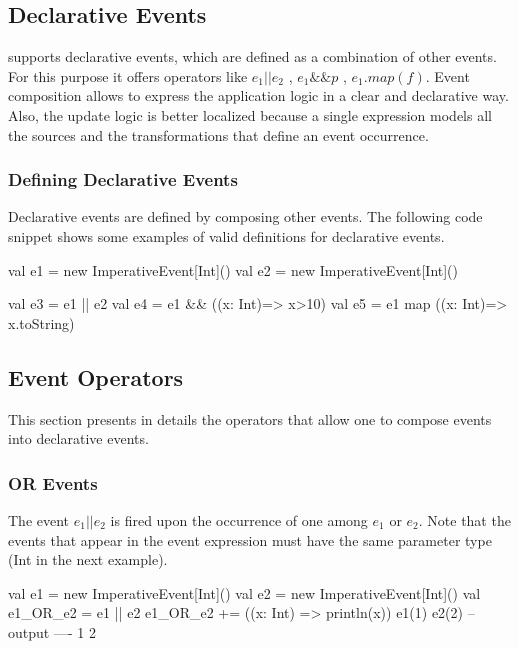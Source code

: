 \documentclass[10pt,a4paper]{article}
\newcommand{\code}[1]{{\fontfamily{cmtt}\small\selectfont#1}}
\newcommand{\REScala}{{\small \sc{REScala}}\xspace}
\begin{document}
\subsection{Declarative Events}

\REScala supports declarative events, which are defined as a
combination of other events. For this purpose it offers operators like
$e_1||e_2$ , $e_1\&\&p$ , $e_1.map(f)$. Event composition allows to
express the application logic in a clear and declarative way. Also,
the update logic is better localized because a single expression
models all the sources and the transformations that define an event
occurrence.


\subsubsection{Defining Declarative Events}

Declarative events are defined by composing other events. The
following code snippet shows some examples of valid definitions for
declarative events.

\begin{codenv}
val e1 = new ImperativeEvent[Int]()
val e2 = new ImperativeEvent[Int]()

val e3 = e1 || e2
val e4 = e1 && ((x: Int)=> x>10)
val e5 = e1 map ((x: Int)=> x.toString)
\end{codenv}


\subsection{Event Operators}

This section presents in details the operators that allow one to
compose events into declarative events.

\subsubsection{OR Events}

The event $e_1 || e_2$ is fired upon the occurrence of one among $e_1$
or $e_2$. Note that the events that appear in the event expression
must have the same parameter type (\code{Int} in the next example).

\begin{codenv}
val e1 = new ImperativeEvent[Int]()
val e2 = new ImperativeEvent[Int]()
val e1_OR_e2 = e1 || e2
e1_OR_e2 += ((x: Int) => println(x))
e1(1)
e2(2)
-- output ----
1
2
\end{codenv}
\end{document}
